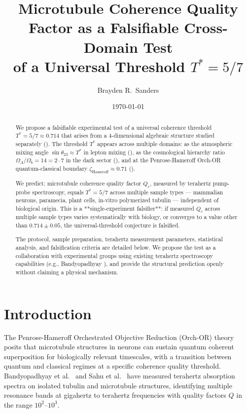 \documentclass[11pt,reqno]{amsart}
\title[Microtubule $Q_c = 5/7$ Falsifiable Test]
{Microtubule Coherence Quality Factor as a Falsifiable Cross-Domain Test \\
 of a Universal Threshold $T^{*} = 5/7$}
\author{Brayden R.~Sanders}
\date{\today}
\theoremstyle{plain}
\theoremstyle{definition}
\theoremstyle{remark}
\begin{document}
\begin{abstract}
We propose a falsifiable experimental test of a universal coherence
threshold $T^{*} = 5/7 \approx 0.714$ that arises from a
4-dimensional algebraic structure studied separately
(\cite{Sanders2026Dirac, Sanders2026Cosmology}). The threshold $T^{*}$
appears across multiple domains: as the atmospheric mixing angle
$\sin\theta_{23} \approx T^{*}$ in lepton mixing
(\cite{Sanders2026Mixing}), as the cosmological hierarchy ratio
$\Omega_\Lambda / \Omega_b = 14 = 2 \cdot 7$ in the dark sector
(\cite{Sanders2026Cosmology}), and at the Penrose-Hameroff Orch-OR
quantum-classical boundary $\zeta_\text{Hameroff} \approx 0.71$
(\cite{HameroffPenrose2014}).

We predict: microtubule coherence quality factor $Q_c$, measured by
terahertz pump-probe spectroscopy, equals $T^{*} = 5/7$ across multiple
sample types --- mammalian neurons, paramecia, plant cells, in-vitro
polymerized tubulin --- independent of biological origin. This is a
**single-experiment falsifier**: if measured $Q_c$ across multiple
sample types varies systematically with biology, or converges to a value
other than $0.714 \pm 0.05$, the universal-threshold conjecture is
falsified.

The protocol, sample preparation, terahertz measurement parameters,
statistical analysis, and falsification criteria are detailed below.
We propose the test as a collaboration with experimental groups using
existing terahertz spectroscopy capabilities (e.g., Bandyopadhyay
\cite{Bandyopadhyay2013, Sahu2013}), and provide the structural
prediction openly without claiming a physical mechanism.
\end{abstract}

\maketitle

\tableofcontents

\section{Introduction}

The Penrose-Hameroff Orchestrated Objective Reduction (Orch-OR) theory
\cite{HameroffPenrose1996, HameroffPenrose2014} posits that
microtubule structures in neurons can sustain quantum coherent
superposition for biologically relevant timescales, with a transition
between quantum and classical regimes at a specific coherence quality
threshold. Bandyopadhyay et al.~\cite{Bandyopadhyay2013} and Sahu et
al.~\cite{Sahu2013} have measured terahertz absorption spectra on
isolated tubulin and microtubule structures, identifying multiple
resonance bands at gigahertz to terahertz frequencies with quality
factors $Q$ in the range $10^2$--$10^3$.
\end{document}
